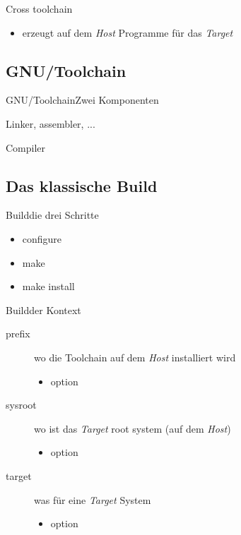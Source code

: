 \begin{frame}{Cross toolchain}
 \begin{itemize}
  \item erzeugt auf dem {\em Host} Programme für das {\em Target}
 \end{itemize}
\end{frame}

\subsection{GNU/Toolchain}

\begin{frame}{GNU/Toolchain}{Zwei Komponenten}
\begin{description}[binutils]
 \item[binutils] Linker, assembler, ...
 \item[gcc] Compiler
\end{description}
\end{frame}

\subsection{Das klassische Build}
\begin{frame}{Build}{die drei Schritte}
 \begin{itemize}
  \item configure
  \item make
  \item make install
 \end{itemize}
\end{frame}

\begin{frame}{Build}{der Kontext}
 \begin{description}
  \item[prefix] wo die Toolchain auf dem {\em Host} installiert wird
  \begin{itemize}
   \item option  
  \end{itemize}
  \item[sysroot] wo ist das {\em Target} root system (auf dem {\em Host})
  \begin{itemize}
   \item option 
  \end{itemize}
  \item[target] was für eine {\em Target} System
  \begin{itemize}
   \item option 
  \end{itemize}
 \end{description}
\end{frame}

